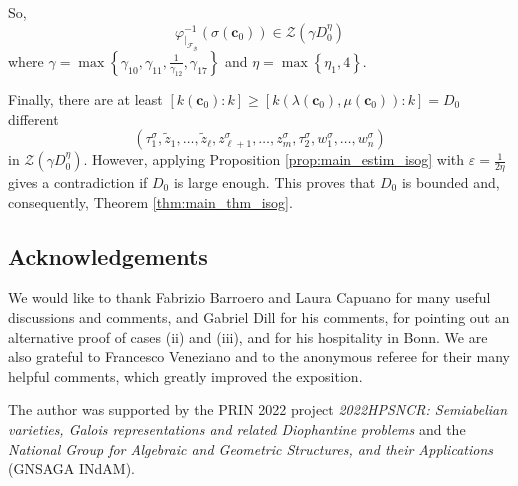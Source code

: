 \documentclass[11pt,a4paper,reqno]{amsart}
\numberwithin{equation}{section}
\newcommand{\cc}{\mathbf{c}}
\newcommand{\g}{\gamma}
\newcommand{\f}{\varphi}
\newcommand{\eps}{\varepsilon}
\renewcommand{\l}{\lambda}
\newcommand{\s}{\sigma}
\newcommand{\m}{\mu}
\newcommand{\pt}[1]{\left( #1 \right)}
\newcommand{\pq}[1]{\left[ #1 \right]}
\newcommand{\pg}[1]{\left\lbrace #1 \right\rbrace}
\theoremstyle{remark}
\theoremstyle{definition}
\theoremstyle{definition}
\begin{document}
So, $$\f^{-1}_{\vert_{\mathcal{F}_{\mathcal{B}}}}\pt{\s(\cc_0)} \in \mathcal{Z}\pt{\g D_0^{\eta}}$$
where $\g=\max\pg{\g_{10},\g_{11}, \frac{1}{\g_{12}}, \g_{17}}$ and $\eta=\max\pg{\eta_1, 4}$.

Finally, there are at least $\pq{k(\cc_0):k}\geq \pq{k(\l(\cc_0),\m(\cc_0)):k}=D_0$ different 
$$\pt{\tau_1^{\s},\widetilde{z}_1, \ldots, \widetilde{z}_{\ell}, z_{\ell+1}^{\s},\ldots, z_m^{\s}, \tau_2^{\s}, w_1^{\s}, \ldots, w_n^{\s}}$$ in $\mathcal{Z}\pt{\g D_0^{\eta}}$. However, applying Proposition \ref{prop:main_estim_isog} with $\eps=\frac{1}{2\eta}$ gives a contradiction if $D_0$ is large enough. This proves that $D_0$ is bounded and, consequently, Theorem \ref{thm:main_thm_isog}.


\subsection*{Acknowledgements}
We would like to thank Fabrizio Barroero and Laura Capuano for many useful discussions and comments, and Gabriel Dill for his comments, for pointing out an alternative proof of cases (ii) and (iii), and for his hospitality in Bonn. We are also grateful to Francesco Veneziano and to the anonymous referee for their many helpful comments, which greatly improved the exposition.

The author was supported by the PRIN 2022 project \emph{2022HPSNCR: Semiabelian varieties, Galois representations and related Diophantine problems} and the \emph{National Group for Algebraic and Geometric Structures, and their Applications} (GNSAGA INdAM).



\end{document}
